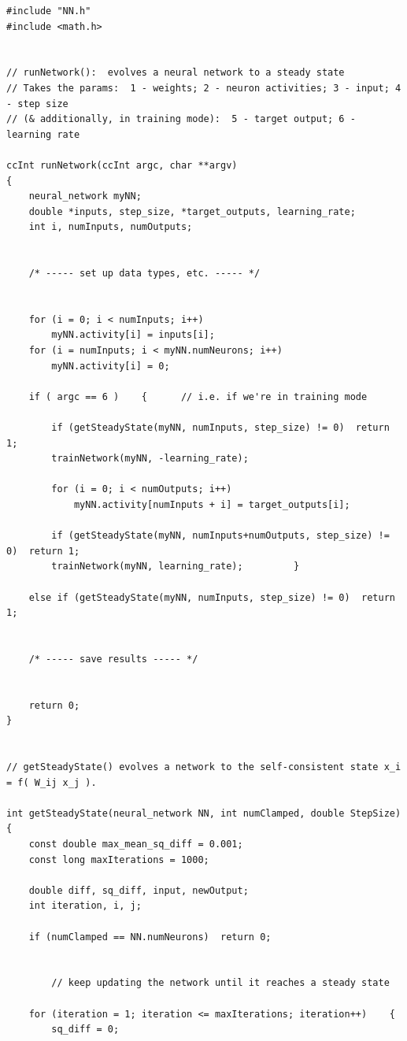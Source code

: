\documentclass{article}
\newenvironment{longcode}{
       \begin{list}{}{
               \setlength{\leftmargin}{0in}
               \setlength{\rightmargin}{0in}
               \setlength{\topsep}{.2in}
       }
       \small
       \item[] }
       { \end{list}   }
\begin{document}
\begin{longcode} \begin{verbatim}
#include "NN.h"
#include <math.h>


// runNetwork():  evolves a neural network to a steady state
// Takes the params:  1 - weights; 2 - neuron activities; 3 - input; 4 - step size
// (& additionally, in training mode):  5 - target output; 6 - learning rate

ccInt runNetwork(ccInt argc, char **argv)
{
    neural_network myNN;
    double *inputs, step_size, *target_outputs, learning_rate;
    int i, numInputs, numOutputs;
    
    
    /* ----- set up data types, etc. ----- */
    
    
    for (i = 0; i < numInputs; i++)
        myNN.activity[i] = inputs[i];
    for (i = numInputs; i < myNN.numNeurons; i++)
        myNN.activity[i] = 0;
    
    if ( argc == 6 )    {      // i.e. if we're in training mode
        
        if (getSteadyState(myNN, numInputs, step_size) != 0)  return 1;
        trainNetwork(myNN, -learning_rate);
        
        for (i = 0; i < numOutputs; i++)
            myNN.activity[numInputs + i] = target_outputs[i];
        
        if (getSteadyState(myNN, numInputs+numOutputs, step_size) != 0)  return 1;
        trainNetwork(myNN, learning_rate);         }
    
    else if (getSteadyState(myNN, numInputs, step_size) != 0)  return 1;
    
    
    /* ----- save results ----- */
    
    
    return 0;
}


// getSteadyState() evolves a network to the self-consistent state x_i = f( W_ij x_j ).

int getSteadyState(neural_network NN, int numClamped, double StepSize)
{
    const double max_mean_sq_diff = 0.001;
    const long maxIterations = 1000;
    
    double diff, sq_diff, input, newOutput;
    int iteration, i, j;
    
    if (numClamped == NN.numNeurons)  return 0;
    
    
        // keep updating the network until it reaches a steady state
    
    for (iteration = 1; iteration <= maxIterations; iteration++)    {
        sq_diff = 0;
        

\end{verbatim}
\end{longcode}
\end{document}
